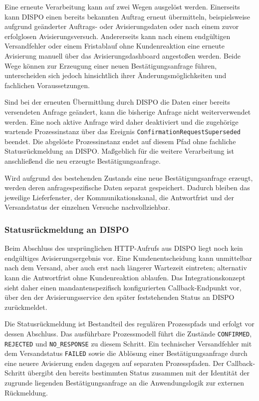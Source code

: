 \documentclass[
  12pt,
  a4paper,
  oneside
]{article}
\begin{document}
Eine erneute Verarbeitung kann auf zwei Wegen ausgelöst werden. Einerseits kann
DISPO einen bereits bekannten Auftrag erneut übermitteln, beispielsweise
aufgrund geänderter Auftrags- oder Avisierungsdaten oder nach einem zuvor
erfolglosen Avisierungsversuch. Andererseits kann nach einem endgültigen
Versandfehler oder einem Fristablauf ohne Kundenreaktion eine erneute Avisierung
manuell über das Avisierungsdashboard angestoßen werden. Beide Wege können zur
Erzeugung einer neuen Bestätigungsanfrage führen, unterscheiden sich jedoch
hinsichtlich ihrer Änderungsmöglichkeiten und fachlichen Voraussetzungen.

Sind bei der erneuten Übermittlung durch DISPO die Daten einer bereits
versendeten Anfrage geändert, kann die bisherige Anfrage nicht weiterverwendet
werden. Eine noch aktive Anfrage wird daher deaktiviert und die zugehörige
wartende Prozessinstanz über das Ereignis
\texttt{ConfirmationRequestSuperseded} beendet. Die abgelöste Prozessinstanz
endet auf diesem Pfad ohne fachliche Statusrückmeldung an DISPO. Maßgeblich für
die weitere Verarbeitung ist anschließend die neu erzeugte
Bestätigungsanfrage.

Wird aufgrund des bestehenden Zustands eine neue Bestätigungsanfrage
erzeugt, werden deren anfragespezifische Daten separat gespeichert. Dadurch
bleiben das jeweilige Lieferfenster, der Kommunikationskanal, die Antwortfrist
und der Versandstatus der einzelnen Versuche nachvollziehbar.

\subsubsection{Statusrückmeldung an DISPO}
\label{sec:statusrueckmeldung-dispo}

Beim Abschluss des ursprünglichen HTTP-Aufrufs aus DISPO liegt noch
kein endgültiges Avisierungsergebnis vor. Eine Kundenentscheidung kann unmittelbar
nach dem Versand, aber auch erst nach längerer Wartezeit eintreten; alternativ
kann die Antwortfrist ohne Kundenreaktion ablaufen. Das Integrationskonzept
sieht daher einen mandantenspezifisch konfigurierten Callback-Endpunkt vor, über
den der Avisierungsservice den später feststehenden Status an DISPO
zurückmeldet.

Die Statusrückmeldung ist Bestandteil des regulären Prozesspfads und erfolgt
vor dessen Abschluss. Das ausführbare Prozessmodell führt die Zustände
\texttt{CONFIRMED}, \texttt{REJECTED} und \texttt{NO\_RESPONSE} zu diesem
Schritt. Ein technischer Versandfehler mit dem Versandstatus \texttt{FAILED}
sowie die Ablösung einer Bestätigungsanfrage durch eine neuere Avisierung
enden dagegen auf separaten Prozesspfaden. Der Callback-Schritt übergibt den
bereits bestimmten Status zusammen mit der Identität der zugrunde liegenden
Bestätigungsanfrage an die Anwendungslogik zur externen Rückmeldung.
\end{document}
